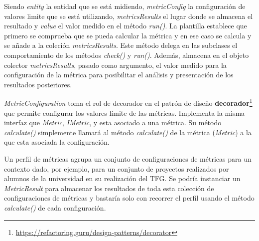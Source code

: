 Siendo \textit{entity} la entidad que se está midiendo, \textit{metricConfig} la configuración de valores limite que se está utilizando, \textit{metricsResults} el lugar donde se almacena el resultado y \textit{value} el valor medido en el método \textit{run()}. La plantilla establece que primero se comprueba que se pueda calcular la métrica y en ese caso se calcula y se añade a la coleción \textit{metricsResults}. 
Este método delega en las subclases el comportamiento de los métodos \textit{check()} y \textit{run()}. Además, almacena en el objeto colector \textit{metricsResults}, pasado como argumento, el valor medido para la configuración de la métrica para posibilitar el análisis y presentación de los resultados posteriores.

\textit{MetricConfiguration} toma el rol de decorador en el patrón de diseño \textbf{decorador}\footnote{\url{https://refactoring.guru/design-patterns/decorator}} que permite configurar los valores límite de las métricas. Implementa la misma interfaz que \textit{Metric}, \textit{IMetric}, y esta asociado a una métrica. Su método \textit{calculate()} simplemente llamará al método \textit{calculate()} de la métrica (\textit{Metric}) a la que esta asociada la configuración.

Un perfil de métricas agrupa un conjunto de configuraciones de métricas para un contexto dado, por ejemplo, para un conjunto de proyectos realizados por alumnos de la universidad en su realización del TFG. Se podría instanciar un \textit{MetricResult} para almacenar los resultados de toda esta colección de configuraciones de métricas y bastaría solo con recorrer el perfil usando el método \textit{calculate()} de cada configuración.

